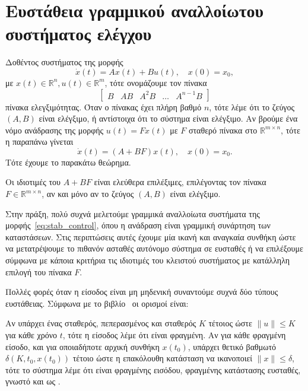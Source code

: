 \section{Ευστάθεια γραμμικού αναλλοίωτου συστήματος ελέγχου}
Δοθέντος συστήματος της μορφής
\begin{equation}\label{eq:stab_control}
    \dot{x}(t) = Ax(t) + Bu(t), \quad x(0) = x_0,
\end{equation}
με \( x(t) \in \mathbb{R}^n, u(t) \in \mathbb{R}^m \),
τότε ονομάζουμε τον πίνακα
\[
    \begin{bmatrix}
        B & AB & A^2B & \dots & A^{n - 1}B
    \end{bmatrix}
\]
πίνακα ελεγξιμότητας. Όταν ο πίνακας έχει πλήρη βαθμό \( n \), τότε λέμε ότι το
ζεύγος \( (A, B) \) είναι ελέγξιμο, ή αντίστοιχα ότι το σύστημα είναι ελέγξιμο.
Αν βρούμε ένα νόμο ανάδρασης της μορφής \( u(t) = Fx(t) \) με \( F \) σταθερό
πίνακα στο \( \mathbb{R}^{m \times n} \), τότε η παραπάνω γίνεται
\[
    \dot{x}(t) = (A + BF)x(t), \quad x(0) = x_0.
\]
Τότε έχουμε το παρακάτω θεώρημα.
\begin{theorem} 
    Οι ιδιοτιμές του \( A + BF \) είναι ελεύθερα επιλέξιμες, επιλέγοντας τον
    πίνακα \( F \in \mathbb{R}^{m \times n} \), αν και μόνο αν το ζεύγος \( (A,
    B) \) είναι ελέγξιμο.
\end{theorem}
Στην πράξη, πολύ συχνά μελετούμε γραμμικά αναλλοίωτα συστήματα της
μορφής~\eqref{eq:stab_control}, όπου η ανάδραση είναι γραμμική συνάρτηση
των καταστάσεων. Στις περιπτώσεις αυτές έχουμε μία ικανή και
αναγκαία συνθήκη ώστε να μετατρέψουμε το πιθανόν ασταθές αυτόνομο σύστημα σε
ευσταθές ή να επιλέξουμε σύμφωνα με κάποια κριτήρια τις ιδιοτιμές του κλειστού
συστήματος με κατάλληλη επιλογή του πίνακα \( F \).

Πολλές φορές όταν η είσοδος είναι μη μηδενική συναντούμε συχνά δύο τύπους
ευστάθειας. Σύμφωνα με το βιβλίο~\cite{brogan1991modern} οι ορισμοί είναι:

\begin{definition} 
    Αν υπάρχει ένας σταθερός, πεπερασμένος και σταθερός \( K \)
    τέτοιος ώστε \( \|u\| \leq K \) για κάθε χρόνο \( t \),
    τότε η είσοδος λέμε ότι είναι φραγμένη. Αν για κάθε φραγμένη
    είσοδο, και για οποιαδήποτε αρχική συνθήκη \( x(t_0) \),
    υπάρχει θετικό βαθμωτό \( \delta(K, t_0, x(t_0)) \) τέτοιο
    ώστε η επακόλουθη κατάσταση να ικανοποιεί \( \|x\| \leq \delta \),
    τότε το σύστημα λέμε ότι είναι φραγμένης εισόδου,
    φραγμένης κατάστασης ευσταθές, γνωστό και ως .
\end{definition}


